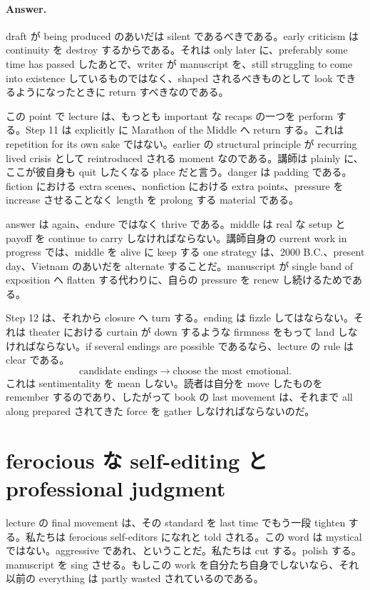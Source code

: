 \paragraph{Answer.} draft が being produced のあいだは silent であるべきである。early criticism は continuity を destroy するからである。それは only later に、preferably some time has passed したあとで、writer が manuscript を、still struggling to come into existence しているものではなく、shaped されるべきものとして look できるようになったときに return すべきなのである。

この point で lecture は、もっとも important な recaps の一つを perform する。Step 11 は explicitly に Marathon of the Middle へ return する。これは repetition for its own sake ではない。earlier の structural principle が recurring lived crisis として reintroduced される moment なのである。講師は plainly に、ここが彼自身も quit したくなる place だと言う。danger は padding である。fiction における extra scenes、nonfiction における extra points、pressure を increase させることなく length を prolong する material である。

answer は again、endure ではなく thrive である。middle は real な setup と payoff を continue to carry しなければならない。講師自身の current work in progress では、middle を alive に keep する one strategy は、2000 B.C.、present day、Vietnam のあいだを alternate することだ。manuscript が single band of exposition へ flatten する代わりに、自らの pressure を renew し続けるためである。

Step 12 は、それから closure へ turn する。ending は fizzle してはならない。それは theater における curtain が down するような firmness をもって land しなければならない。if several endings are possible であるなら、lecture の rule は clear である。
\begin{equation}
\text{candidate endings} \to \text{choose the most emotional}.
\end{equation}
これは sentimentality を mean しない。読者は自分を move したものを remember するのであり、したがって book の last movement は、それまで all along prepared されてきた force を gather しなければならないのだ。

\section{ferocious な self-editing と professional judgment}

lecture の final movement は、その standard を last time でもう一段 tighten する。私たちは ferocious self-editors になれと told される。この word は mystical ではない。aggressive であれ、ということだ。私たちは cut する。polish する。manuscript を sing させる。もしこの work を自分たち自身でしないなら、それ以前の everything は partly wasted されているのである。

